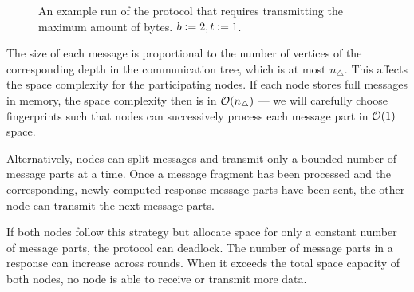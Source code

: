 \documentclass[conference]{IEEEtran}
\begin{document}
\begin{figure*}
\begin{scaletikzpicturetowidth}{\textwidth}
\end{scaletikzpicturetowidth}

\caption{An example run of the protocol that requires transmitting the maximum amount of bytes. $b \vcentcolon= 2, t \vcentcolon= 1$.}

\label{fig:worst-bytes}
\end{figure*}

The size of each message is proportional to the number of vertices of the corresponding depth in the communication tree, which is at most $n_{\triangle}$. This affects the space complexity for the participating nodes. If each node stores full messages in memory, the space complexity then is in $\mathcal{O}(n_{\triangle})$ --- we will carefully choose fingerprints such that nodes can successively process each message part in $\mathcal{O}(1)$ space.

Alternatively, nodes can split messages and transmit only a bounded number of message parts at a time. Once a message fragment has been processed and the corresponding, newly computed response message parts have been sent, the other node can transmit the next message parts.

If both nodes follow this strategy but allocate space for only a constant number of message parts, the protocol can deadlock. The number of message parts in a response can increase across rounds. When it exceeds the total space capacity of both nodes, no node is able to receive or transmit more data.
\end{document}
